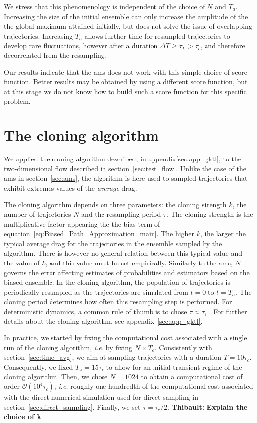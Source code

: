 \documentclass{jfm}
\begin{document}
We stress that this phenomenology is independent of the choice of $N$ and $T_a$.
Increasing the size of the initial ensemble can only increase the amplitude of the the global maximum attained initially, but does not solve the issue of overlapping trajectories.
Increasing $T_a$ allows further time for resampled trajectories to develop rare fluctuations, however after a duration $\Delta T \geq \tau_L > \tau_c$, and therefore decorrelated from the resampling.

Our results indicate that the \ac{ams} does not work with this simple choice of score function.
Better results may be obtained by using a different score function, but at this stage we do not know how to build such a score function for this specific problem.

\section{The cloning algorithm}
\label{sec:cloning}
We applied the cloning algorithm described, in appendix\ref{sec:app_gktl}, to the two-dimensional flow described in section~\ref{sec:test_flow}.
Unlike the case of the \ac{ams} in section~\ref{sec:ams}, the algorithm is here used to sampled trajectories that exhibit extremes values of
the \emph{average} drag.

The cloning algorithm depends on three parameters: the cloning strength $k$, the number of trajectories $N$ and the resampling period $\tau$.
The cloning strength is the multiplicative factor appearing the the bias term of equation~\eqref{eq:Biased_Path_Approximation_main}.
The higher $k$, the larger the typical average drag for the trajectories in the ensemble sampled by the algorithm.
There is however no general relation between this typical value and the value of $k$, and this value must be set empirically.
Similarly to the \ac{ams}, $N$ governs the error affecting estimates of probabilities and estimators based on the biased ensemble.
In the cloning algorithm, the population of trajectories is periodically resampled as the trajectories are simulated from $t=0$ to
$t=T_a$.
The cloning period determines how often this resampling step is performed.
For deterministic dynamics, a common rule of thumb is to chose $\tau \approx \tau_c$ \citep{giardina_direct_2006}.
For further details about the cloning algorithm, see appendix~\ref{sec:app_gktl}.

In practice, we started by fixing the computational cost associated with a single run of the cloning algorithm, \textit{i.e.} by fixing $N \times T_a$.
Consistently with section~\ref{sec:time_avg}, we aim at sampling trajectories with a duration $T = 10\tau_c$.
Consequently, we fixed $T_a = 15\tau_c$ to allow for an initial transient regime of the cloning algorithm.
Then, we chose $N = 1024$ to obtain a computational cost of order $\mathcal{O}(10^4 \tau_c)$, \textit{i.e.} roughly one hundredth of the computational cost associated with the direct numerical simulation used for direct sampling in section~\ref{sec:direct_sampling}.
Finally, we set $\tau = \tau_c / 2$.
\textbf{Thibault: Explain the choice of k}
\end{document}
